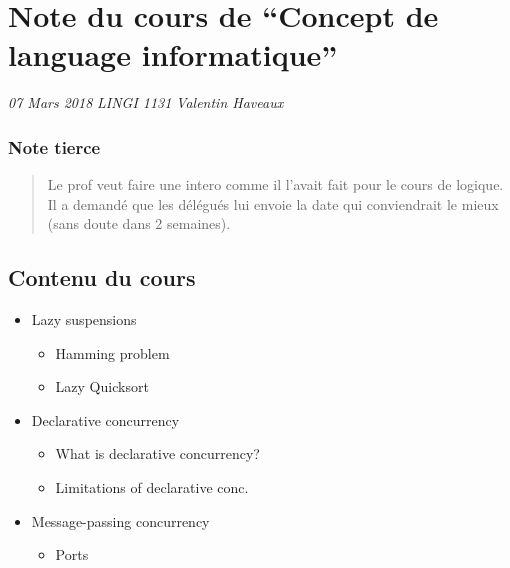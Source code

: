 \documentclass[]{article}
\date{}
\providecommand{\tightlist}{%
  \setlength{\itemsep}{0pt}\setlength{\parskip}{0pt}}
\begin{document}
\hypertarget{note-du-cours-de-concept-de-language-informatique}{%
\section{Note du cours de ``Concept de language
informatique''}\label{note-du-cours-de-concept-de-language-informatique}}

\emph{07 Mars 2018} \emph{LINGI 1131} \emph{Valentin Haveaux}

\hypertarget{note-tierce}{%
\subsubsection{Note tierce}\label{note-tierce}}

\begin{quote}
Le prof veut faire une intero comme il l'avait fait pour le cours de
logique. Il a demandé que les délégués lui envoie la date qui
conviendrait le mieux (sans doute dans 2 semaines).
\end{quote}

\hypertarget{contenu-du-cours}{%
\subsection{Contenu du cours}\label{contenu-du-cours}}

\begin{itemize}
\tightlist
\item
  Lazy suspensions

  \begin{itemize}
  \tightlist
  \item
    Hamming problem
  \item
    Lazy Quicksort
  \end{itemize}
\item
  Declarative concurrency

  \begin{itemize}
  \tightlist
  \item
    What is declarative concurrency?
  \item
    Limitations of declarative conc.
  \end{itemize}
\item
  Message-passing concurrency

  \begin{itemize}
  \tightlist
  \item
    Ports
  \end{itemize}
\end{itemize}
\end{document}
